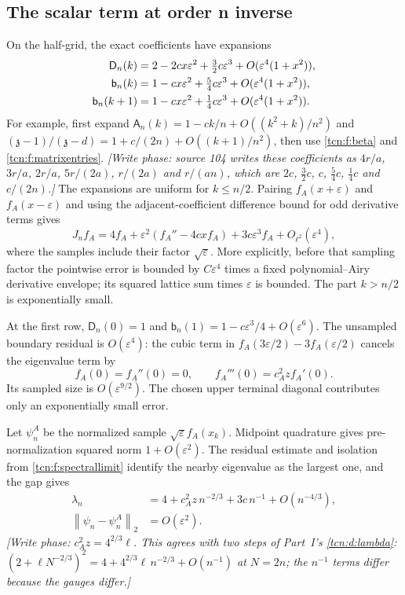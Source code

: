 \documentclass[11pt,letterpaper]{article}
\newcommand{\norm}[1]{\left\lVert#1\right\rVert}
\newcommand{\eps}{\varepsilon}
\theoremstyle{remark}
\begin{document}
\subsection{The scalar term at order n inverse}
On the half-grid, the exact coefficients have expansions
\begin{align}
 \mathsf D_n(k)&=2-2cx\eps^2+\tfrac32c\eps^3
             +O(\eps^4(1+x^2)),\notag\\
 \mathsf b_n(k)&=1-cx\eps^2+\tfrac54c\eps^3
             +O(\eps^4(1+x^2)),\label{tcn:f:localcoeff}\\
 \mathsf b_n(k+1)&=1-cx\eps^2+\tfrac14c\eps^3
             +O(\eps^4(1+x^2)).\notag
\end{align}
For example, first expand $\mathsf A_n(k)=1-ck/n+O((k^2+k)/n^2)$ and $(\mathfrak z-1)/(\mathfrak z-d)=1+c/(2n)+O((k+1)/n^2)$, then use \eqref{tcn:f:beta} and \eqref{tcn:f:matrixentries}. \emph{[Write phase: source 104 writes these coefficients as $4r/a$, $3r/a$, $2r/a$, $5r/(2a)$, $r/(2a)$ and $r/(an)$, which are $2c$, $\tfrac32c$, $c$, $\tfrac54c$, $\tfrac14c$ and $c/(2n)$.]} The expansions are uniform for $k\le n/2$. Pairing $f_A(x+\eps)$ and $f_A(x-\eps)$ and using the adjacent-coefficient difference bound for odd derivative terms gives
\[
 J_nf_A=4f_A+\eps^2\left(f_A''-4cxf_A\right)
              +3c\eps^3f_A+O_{\ell^2}(\eps^4),
\]
where the samples include their factor $\sqrt\eps$. More explicitly, before that sampling factor the pointwise error is bounded by $C\eps^4$ times a fixed polynomial--Airy derivative envelope; its squared lattice sum times $\eps$ is bounded. The part $k>n/2$ is exponentially small.

At the first row, $\mathsf D_n(0)=1$ and $\mathsf b_n(1)=1-c\eps^3/4+O(\eps^6)$. The unsampled boundary residual is $O(\eps^4)$: the cubic term in $f_A(3\eps/2)-3f_A(\eps/2)$ cancels the eigenvalue term by
\[
 f_A(0)=f_A''(0)=0,\qquad f_A'''(0)=c_A^2zf_A'(0).
\]
Its sampled size is $O(\eps^{9/2})$. The chosen upper terminal diagonal contributes only an exponentially small error.

Let $\psi^A_n$ be the normalized sample $\sqrt\eps f_A(x_k)$. Midpoint quadrature gives pre-normalization squared norm $1+O(\eps^2)$. The residual estimate and isolation from \eqref{tcn:f:spectrallimit} identify the nearby eigenvalue as the largest one, and the gap gives
\begin{align}
 \lambda_n&=4+c_A^2z\,n^{-2/3}+3c\,n^{-1}
                                      +O(n^{-4/3}),\label{tcn:f:lambda}\\
 \norm{\psi_n-\psi^A_n}_2&=O(\eps^2).\label{tcn:f:profileapprox}
\end{align}
\emph{[Write phase: $c_A^2z=4^{2/3}\ell$. This agrees with two steps of Part~I's \eqref{tcn:d:lambda}: $(2+\ell N^{-2/3})^2=4+4^{2/3}\ell\,n^{-2/3}+O(n^{-1})$ at $N=2n$; the $n^{-1}$ terms differ because the gauges differ.]}
\end{document}
